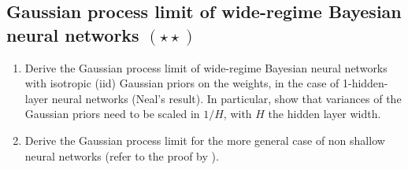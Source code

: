 \documentclass{article}
\begin{document}
\subsection{Gaussian process limit of wide-regime Bayesian neural networks $(\star\star)$}
\begin{enumerate}
\item 
Derive the Gaussian process limit of wide-regime Bayesian neural networks with isotropic (iid) Gaussian priors on the weights, in the case of 1-hidden-layer neural networks (Neal's result). In particular, show that variances of the Gaussian priors need to be scaled in $1/H$, with $H$ the hidden layer width. 
\item Derive the Gaussian process limit for the more general case of non shallow neural networks (refer to the proof by \cite{matthews2018gaussian}).
\end{enumerate}

\printbibliography
\end{document}
